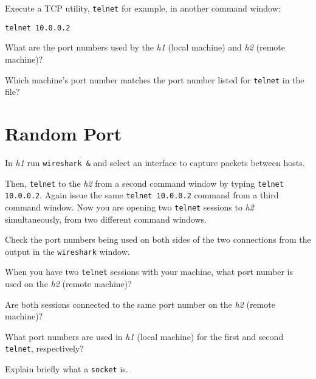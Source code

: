 \documentclass{../UTNetLab}
\begin{document}
    Execute a TCP utility, \lstinline{telnet} for example, in another command window:
    \begin{lstlisting}
telnet 10.0.0.2
    \end{lstlisting}
    
    \begin{report}
    \item What are the port numbers used by the \textit{h1} (local machine) and \textit{h2} (remote machine)?

    \item Which machine’s port number matches the port number listed for \lstinline{telnet} in the  file?
    \end{report}

\section{Random Port}
    In \textit{h1} run \lstinline{wireshark &} and select an interface to capture packets between hosts.

    Then, \lstinline{telnet} to the \textit{h2} from a second command window by typing \lstinline{telnet 10.0.0.2}.
    Again issue the same \lstinline{telnet 10.0.0.2} command from a third command window.
    Now you are opening two \lstinline{telnet} sessions to \textit{h2} simultaneously, from two different command windows.

    Check the port numbers being used on both sides of the two connections from the output in the \lstinline{wireshark} window.

    \begin{report}
    \item When you have two \lstinline{telnet} sessions with your machine, what port number is used on the \textit{h2} (remote machine)?

    \item Are both sessions connected to the same port number on the \textit{h2} (remote machine)?

    \item What port numbers are used in \textit{h1} (local machine) for the first and second \lstinline{telnet}, respectively?

    \item Explain briefly what a \lstinline{socket} is.
    \end{report}
\end{document}
